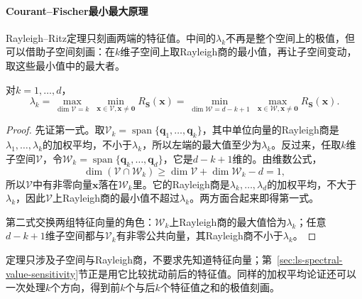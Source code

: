 \paragraph{Courant--Fischer最小最大原理}

Rayleigh--Ritz定理只刻画两端的特征值。中间的$\lambda_k$不再是整个空间上的极值，但可以借助子空间刻画：在$k$维子空间上取Rayleigh商的最小值，再让子空间变动，取这些最小值中的最大者。

\begin{theorem}
\label{thm:matrix-analysis-courant-fischer}
\label{eq:matrix-analysis-courant-fischer}
对$k=1,\ldots,d$，
\begin{equation*}
 \lambda_k=\max_{\dim\mathcal V=k}\ \min_{\bm x\in\mathcal V,\bm x\neq\bm0}R_{\bm S}(\bm x)
 =\min_{\dim\mathcal W=d-k+1}\ \max_{\bm x\in\mathcal W,\bm x\neq\bm0}R_{\bm S}(\bm x).
\end{equation*}
\end{theorem}
\begin{proof}
先证第一式。取$\mathcal V_k=\operatorname{span}\{\bm q_1,\dots,\bm q_k\}$，其中单位向量的Rayleigh商是$\lambda_1,\ldots,\lambda_k$的加权平均，不小于$\lambda_k$，所以左端的最大值至少为$\lambda_k$。反过来，任取$k$维子空间$\mathcal V$，令$\mathcal W_k=\operatorname{span}\{\bm q_k,\dots,\bm q_d\}$，它是$d-k+1$维的。由维数公式，
\[
 \dim(\mathcal V\cap\mathcal W_k)\geq\dim\mathcal V+\dim\mathcal W_k-d=1,
\]
所以$\mathcal V$中有非零向量$\bm x$落在$\mathcal W_k$里。它的Rayleigh商是$\lambda_k,\ldots,\lambda_d$的加权平均，不大于$\lambda_k$，因此$\mathcal V$上Rayleigh商的最小值不超过$\lambda_k$。两方面合起来即得第一式。

第二式交换两组特征向量的角色：$\mathcal W_k$上Rayleigh商的最大值恰为$\lambda_k$；任意$d-k+1$维子空间都与$\mathcal V_k$有非零公共向量，其Rayleigh商不小于$\lambda_k$。
\end{proof}
定理只涉及子空间与Rayleigh商，不要求先知道特征向量；第~\ref{sec:ls-spectral-value-sensitivity}节正是用它比较扰动前后的特征值。同样的加权平均论证还可以一次处理$k$个方向，得到前$k$个与后$k$个特征值之和的极值刻画。

